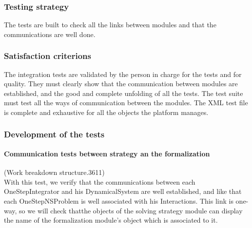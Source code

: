 \subsubsection{Testing strategy}
The tests are built to check all the links between modules and that the communications are well done.

\subsubsection{Satisfaction criterions}
The integration tests are validated by the person in charge for the tests and for quality.
They must clearly show that the communication between modules are established, and the good and complete unfolding of all the tests.
The test suite must test all the ways of communication between the modules. The XML test file is complete and exhaustive for all the
objects the platform manages.

\subsubsection{Development of the tests}
\paragraph{Communication tests between strategy an the formalization}
(Work breakdown structure.3611)\\
With this test, we verify that the communications between each OneStepIntegrator and his DynamicalSystem are well established, and like
that each OneStepNSProblem is well associated with his Interactions. This link is one-way, so we will check thatthe objects of the
solving strategy module can display the name of the formalization module's object which is associated to it.

